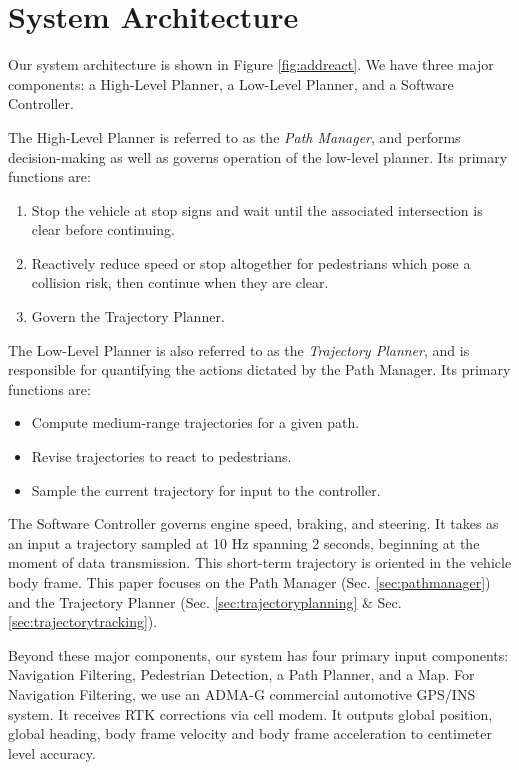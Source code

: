 \documentclass[letterpaper, 10 pt, conference]{ieeeconf}  %
\begin{document}

\section{System Architecture} \label{sec:systemarchirecture}

Our system architecture is shown in Figure \ref{fig:addreact}. We have three major components: a High-Level Planner, a Low-Level Planner, and a Software Controller.

The High-Level Planner is referred to as the {\it Path Manager}, and performs decision-making as well as governs operation of the low-level planner.
Its primary functions are:
\begin{enumerate}
  \item Stop the vehicle at stop signs and wait until the associated intersection is clear before continuing.
  \item Reactively reduce speed or stop altogether for pedestrians which pose a collision risk, then continue when they are clear.
  \item Govern the Trajectory Planner.
\end{enumerate}
The Low-Level Planner is also referred to as the {\it Trajectory Planner}, and is responsible for quantifying the actions dictated by the Path Manager.
Its primary functions are:
\begin{itemize}
  \item Compute medium-range trajectories for a given path.
  \item Revise trajectories to react to pedestrians.
  \item Sample the current trajectory for input to the controller.
\end{itemize}

The Software Controller governs engine speed, braking, and steering.
It takes as an input a trajectory sampled at 10 Hz spanning 2 seconds, beginning at the moment of data transmission.
This short-term trajectory is oriented in the vehicle body frame.
This paper focuses on the Path Manager (Sec. \ref{sec:pathmanager}) and the Trajectory Planner (Sec. \ref{sec:trajectoryplanning} \& Sec. \ref{sec:trajectorytracking}).


Beyond these major components, our system has four primary input components: Navigation Filtering, Pedestrian Detection, a Path Planner, and a Map.
For Navigation Filtering, we use an ADMA-G  commercial automotive GPS/INS system.
It receives RTK corrections via cell modem.
It outputs global position, global heading, body frame velocity and body frame acceleration to centimeter level accuracy.
\end{document}
